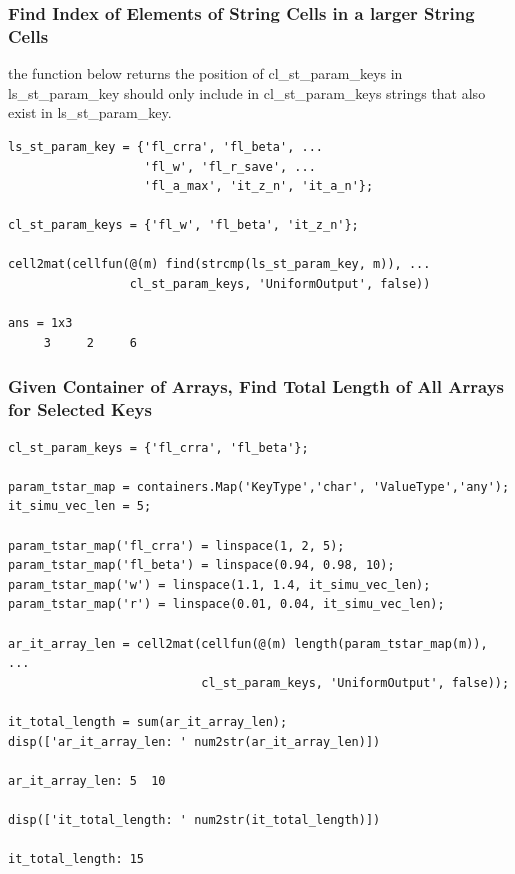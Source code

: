 \documentclass[
]{book}
\begin{document}
\hypertarget{find-index-of-elements-of-string-cells-in-a-larger-string-cells}{%
\subsubsection{Find Index of Elements of String Cells in a larger String Cells}\label{find-index-of-elements-of-string-cells-in-a-larger-string-cells}}

the function below returns the position of cl\_st\_param\_keys in
ls\_st\_param\_key should only include in cl\_st\_param\_keys strings
that also exist in ls\_st\_param\_key.

\begin{verbatim}
ls_st_param_key = {'fl_crra', 'fl_beta', ...
                   'fl_w', 'fl_r_save', ...
                   'fl_a_max', 'it_z_n', 'it_a_n'};

cl_st_param_keys = {'fl_w', 'fl_beta', 'it_z_n'};

cell2mat(cellfun(@(m) find(strcmp(ls_st_param_key, m)), ...
                 cl_st_param_keys, 'UniformOutput', false))

ans = 1x3    
     3     2     6
\end{verbatim}

\hypertarget{given-container-of-arrays-find-total-length-of-all-arrays-for-selected-keys}{%
\subsubsection{Given Container of Arrays, Find Total Length of All Arrays for Selected Keys}\label{given-container-of-arrays-find-total-length-of-all-arrays-for-selected-keys}}

\begin{verbatim}
cl_st_param_keys = {'fl_crra', 'fl_beta'};

param_tstar_map = containers.Map('KeyType','char', 'ValueType','any');
it_simu_vec_len = 5;

param_tstar_map('fl_crra') = linspace(1, 2, 5);
param_tstar_map('fl_beta') = linspace(0.94, 0.98, 10);
param_tstar_map('w') = linspace(1.1, 1.4, it_simu_vec_len);
param_tstar_map('r') = linspace(0.01, 0.04, it_simu_vec_len);

ar_it_array_len = cell2mat(cellfun(@(m) length(param_tstar_map(m)), ...
                           cl_st_param_keys, 'UniformOutput', false));

it_total_length = sum(ar_it_array_len);
disp(['ar_it_array_len: ' num2str(ar_it_array_len)])

ar_it_array_len: 5  10

disp(['it_total_length: ' num2str(it_total_length)])

it_total_length: 15
\end{verbatim}
\end{document}
